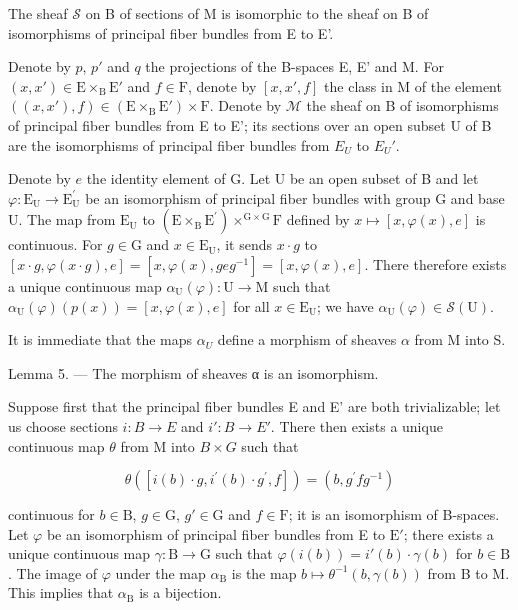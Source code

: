 The sheaf \(\mathcal{S}\) on B of sections of M is isomorphic to the sheaf on B of isomorphisms of principal fiber bundles from E to E'.

Denote by \(p\), \(p'\) and \(q\) the projections of the B-spaces E, E' and M. For \((x, x') \in \mathrm{E} \times_{\mathrm{B}} \mathrm{E}'\) and \(f \in \mathrm{F}\), denote by \([x, x', f]\) the class in M of the element \(((x, x'), f) \in (\mathrm{E} \times_{\mathrm{B}} \mathrm{E}') \times \mathrm{F}\). Denote by \(\mathcal{M}\) the sheaf on B of isomorphisms of principal fiber bundles from E to E'; its sections over an open subset U of B are the isomorphisms of principal fiber bundles from \(E_{U}\) to \(E_{U}'\).

Denote by \(e\) the identity element of G. Let U be an open subset of B and let \(\varphi\colon\mathrm{E}_{\mathrm{U}}\to\mathrm{E}_{\mathrm{U}}^{\prime}\) be an isomorphism of principal fiber bundles with group G and base U. The map from \(\mathrm{E}_{\mathrm{U}}\) to \((\mathrm{E}\times_{\mathrm{B}}\mathrm{E}^{\prime})\times^{\mathrm{G}\times\mathrm{G}}\mathrm{F}\) defined by \(x\mapsto[x,\varphi(x),e]\) is continuous. For \(g\in\mathrm{G}\) and \(x\in\mathrm{E}_{\mathrm{U}}\), it sends \(x\cdot g\) to \([x\cdot g,\varphi(x\cdot g),e]=[x,\varphi(x),geg^{-1}]=[x,\varphi(x),e]\). There therefore exists a unique continuous map \(\alpha_{\mathrm{U}}(\varphi)\colon\mathrm{U}\to\mathrm{M}\) such that \(\alpha_{\mathrm{U}}(\varphi)(p(x))=[x,\varphi(x),e]\) for all \(x\in\mathrm{E}_{\mathrm{U}}\); we have \(\alpha_{\mathrm{U}}(\varphi)\in\mathcal{S}(\mathrm{U})\).

It is immediate that the maps \(\alpha_{U}\) define a morphism of sheaves \(\alpha\) from M into S.

Lemma 5. --- The morphism of sheaves α is an isomorphism.

Suppose first that the principal fiber bundles E and E' are both trivializable; let us choose sections \(i: B \to E\) and \(i': B \to E'\). There then exists a unique continuous map \(\theta\) from M into \(B \times G\) such that

\[
\theta ([ i (b) \cdot g, i ^ {\prime} (b) \cdot g ^ {\prime}, f ]) = (b, g ^ {\prime} f g ^ {- 1})
\]

continuous for \(b \in \mathrm{B}\), \(g \in \mathrm{G}\), \(g' \in \mathrm{G}\) and \(f \in \mathrm{F}\); it is an isomorphism of B-spaces. Let \(\varphi\) be an isomorphism of principal fiber bundles from E to \(\mathrm{E}'\); there exists a unique continuous map \(\gamma: \mathrm{B} \to \mathrm{G}\) such that \(\varphi(i(b)) = i'(b) \cdot \gamma(b)\) for \(b \in \mathrm{B}\). The image of \(\varphi\) under the map \(\alpha_{\mathrm{B}}\) is the map \(b \mapsto \theta^{-1}(b, \gamma(b))\) from B to M. This implies that \(\alpha_{\mathrm{B}}\) is a bijection.


